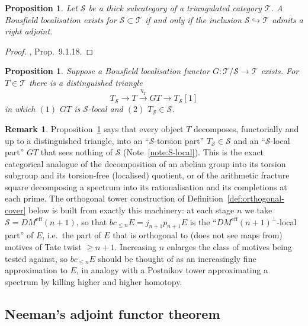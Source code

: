 \documentclass[12pt,a4paper]{article}
\newtheorem{proposition}[theorem]{Proposition}
\theoremstyle{definition}
\newtheorem{remark}[theorem]{Remark}
\begin{document}
\begin{proposition}\label{prop:Bousfield-exists}
Let $\mathcal{S}$ be a thick subcategory of a triangulated category $\mathcal{T}$.  A
Bousfield localisation exists for $\mathcal{S}\subset\mathcal{T}$ if and only if the
inclusion $\mathcal{S}\hookrightarrow\mathcal{T}$ admits a right adjoint.
\end{proposition}
\begin{proof}
\cite{Nee01}, Prop.\ 9.1.18.
\end{proof}

\begin{proposition}\label{prop:Bousfield-triangle}
Suppose a Bousfield localisation functor $G:\mathcal{T}/\mathcal{S}\to\mathcal{T}$
exists.  For $T\in\mathcal{T}$ there is a distinguished triangle
\[
  T_\mathcal{S} \longrightarrow T \xrightarrow{\eta_T} GT \longrightarrow T_\mathcal{S}[1]
\]
in which $(1)$ $GT$ is $\mathcal{S}$-local and $(2)$ $T_\mathcal{S}\in\mathcal{S}$.
\end{proposition}

\begin{remark}\label{rem:Bousfield-intuition}
Proposition~\ref{prop:Bousfield-triangle} says that every object $T$ decomposes,
functorially and up to a distinguished triangle, into an ``$\mathcal{S}$-torsion
part'' $T_\mathcal{S}\in\mathcal{S}$ and an ``$\mathcal{S}$-local part'' $GT$ that
sees nothing of $\mathcal{S}$ (Note~\ref{note:S-local}).  This is the exact
categorical analogue of the decomposition of an abelian group into its torsion
subgroup and its torsion-free (localised) quotient, or of the arithmetic
fracture square decomposing a spectrum into its rationalisation and its
completions at each prime.  The orthogonal tower construction of
Definition~\ref{def:orthogonal-cover} below is built from exactly this
machinery: at each stage $n$ we take $\mathcal{S}=DM^{\mathrm{eff}}(n+1)$, so that
$bc_{\leq n}E=j_{n+1}p_{n+1}E$ is the ``$DM^{\mathrm{eff}}(n+1)^\perp$-local
part'' of $E$, i.e.\ the part of $E$ that is orthogonal to (does not see maps
from) motives of Tate twist $\geq n+1$.  Increasing $n$ enlarges the class of
motives being tested against, so $bc_{\leq n}E$ should be thought of as an
increasingly fine approximation to $E$, in analogy with a Postnikov tower
approximating a spectrum by killing higher and higher homotopy.
\end{remark}

\subsection{Neeman's adjoint functor theorem}
\end{document}
